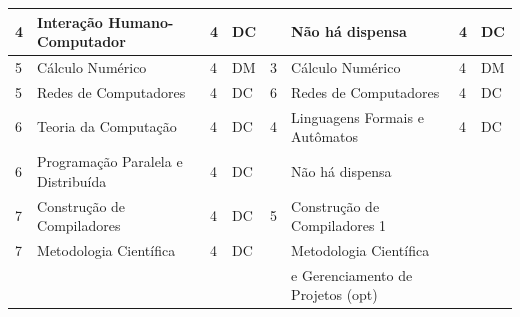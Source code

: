 \begin{longtable}{|x{1cm}|x{4cm}|x{1cm}|x{1.1cm}|x{1cm}|x{4cm}|x{1cm}|x{1.1cm}|}
\hline

4 & Interação Humano-Computador & 4 & DC &
& Não há dispensa & 4 & DC \\

\hline
\hline

5 & Cálculo Numérico & 4 & DM &
3 & Cálculo Numérico & 4 & DM \\ 

\hline

5 & Redes de Computadores & 4 & DC &
6 & Redes de Computadores & 4 & DC \\

\hline
\hline

6 & Teoria da Computação & 4 & DC &
4 & Linguagens Formais e Autômatos & 4 & DC \\ 

\hline

6 & Programação Paralela e Distribuída & 4 & DC &
 & Não há dispensa &  & \\ 

\hline
\hline

7 & Construção de Compiladores & 4 & DC &
5 & Construção de Compiladores 1 & &  \\ 
  
\hline

7 & Metodologia Científica & 4 & DC &
  & Metodologia Científica & &  \\
  
  & & & &
  & e Gerenciamento de Projetos (opt) & &
  
\\
 \hline
  


\end{longtable}

\setlength{\tabcolsep}{4pt}

\singlespacing



\setlength{\tabcolsep}{3pt}



\newpage


